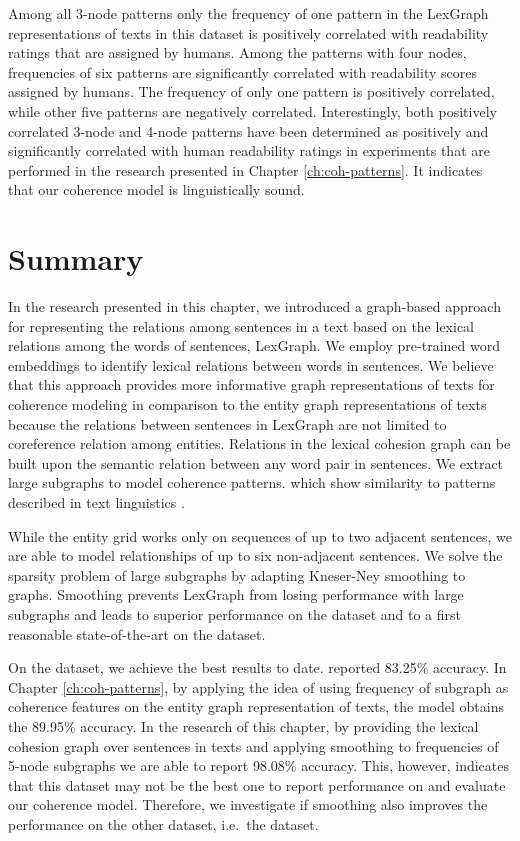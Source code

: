 %
Among all 3-node patterns only the frequency of one pattern in the LexGraph representations of texts in this dataset is positively correlated with readability ratings that are assigned by humans.  
Among the patterns with four nodes, frequencies of six patterns are significantly correlated with readability scores assigned by humans. 
The frequency of only one pattern is positively correlated, while other five patterns are negatively correlated. 
Interestingly, both positively correlated 3-node and 4-node patterns have been determined as positively and significantly correlated with human readability ratings in experiments that are performed in the research presented in Chapter \ref{ch:coh-patterns}.
It indicates that our coherence model is linguistically sound.  

\section{Summary}
\label{sec:lex-graph-summary}

In the research presented in this chapter, we introduced a graph-based approach for representing the relations among sentences in a text based on the lexical relations among the words of sentences, LexGraph. 
We employ pre-trained word embeddings to identify lexical relations between words in sentences. 
We believe that this approach provides more informative graph representations of texts for coherence modeling in comparison to the entity graph representations of texts because the relations between sentences in LexGraph are not limited to coreference relation among entities. 
Relations in the lexical cohesion graph can be built upon the semantic relation between any word pair in sentences. 
We extract large subgraphs to model coherence patterns. 
 which show similarity to patterns described in
text linguistics \cite{danes74a}.

While the entity grid works only on sequences of up to two adjacent sentences, we are able to model relationships of up to six non-adjacent sentences. 
We solve the sparsity problem of large subgraphs by adapting \mbox{Kneser-Ney} smoothing to graphs. 
Smoothing prevents LexGraph from losing performance with large subgraphs and leads to superior performance on the  dataset and to a first reasonable \mbox{state-of-the-art} on the  dataset.

On the \pitlerds dataset, we achieve the best results to date.  
 reported 83.25\% accuracy. 
In Chapter \ref{ch:coh-patterns}, by applying the idea of using frequency of subgraph as coherence features on the entity graph representation of texts, the model obtains the 89.95\% accuracy. 
In the research of this chapter, by providing the lexical cohesion graph over sentences in texts and applying smoothing to frequencies of 5-node subgraphs we are able to report 98.08\% accuracy. 
This, however, indicates that this dataset may not be the best one to report performance on and evaluate our coherence model. 
Therefore, we investigate if smoothing also improves the performance on the other dataset, i.e.\ the \declercqds dataset.


